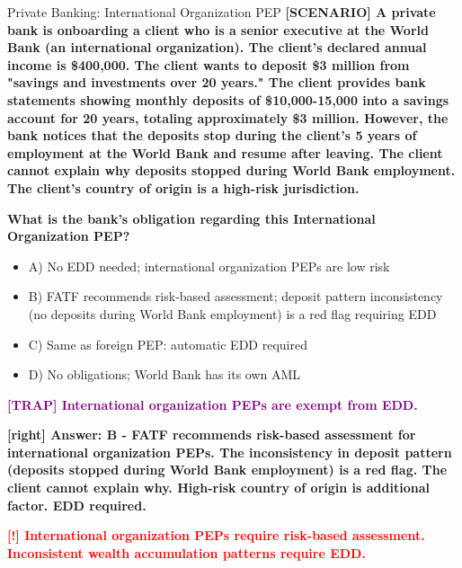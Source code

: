 \documentclass[11pt,a4paper]{beamer}
\newcommand{\redflag}[1]{\textcolor{red}{\textbf{[!] #1}}}
\newcommand{\trap}[1]{\textcolor{purple}{\textbf{[TRAP] #1}}}
\newcommand{\correct}[1]{\textcolor{green!50!black}{\textbf{[right] #1}}}
\newcommand{\scenario}[1]{\textcolor{blue!70!black}{\textbf{[SCENARIO] #1}}}
\begin{document}
	
	\begin{frame}{Private Banking: International Organization PEP}
		\tiny
		\scenario{A private bank is onboarding a client who is a senior executive at the World Bank (an international organization). The client's declared annual income is \$400,000. The client wants to deposit \$3 million from "savings and investments over 20 years." The client provides bank statements showing monthly deposits of \$10,000-15,000 into a savings account for 20 years, totaling approximately \$3 million. However, the bank notices that the deposits stop during the client's 5 years of employment at the World Bank and resume after leaving. The client cannot explain why deposits stopped during World Bank employment. The client's country of origin is a high-risk jurisdiction.}
		
		\vspace{0.02cm}
		\textbf{What is the bank's obligation regarding this International Organization PEP?}
		\vspace{0.02cm}
		
		\begin{itemize}
			\item A) No EDD needed; international organization PEPs are low risk
			\item B) FATF recommends risk-based assessment; deposit pattern inconsistency (no deposits during World Bank employment) is a red flag requiring EDD
			\item C) Same as foreign PEP: automatic EDD required
			\item D) No obligations; World Bank has its own AML
		\end{itemize}
		
		\vspace{0.02cm}
		\trap{International organization PEPs are exempt from EDD.}
		
		\vspace{0.02cm}
		\correct{Answer: B - FATF recommends risk-based assessment for international organization PEPs. The inconsistency in deposit pattern (deposits stopped during World Bank employment) is a red flag. The client cannot explain why. High-risk country of origin is additional factor. EDD required.}
		
		\vspace{0.02cm}
		\redflag{International organization PEPs require risk-based assessment. Inconsistent wealth accumulation patterns require EDD.}
	\end{frame}
	
\end{document}
